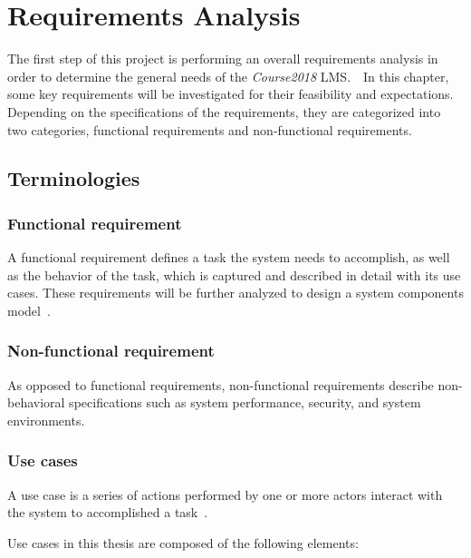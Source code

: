 

\chapter{Requirements Analysis}
\label{chap:REQS}

The first step of this project is performing an overall requirements analysis
in order to determine the general needs of the \emph{Course2018} LMS.\ \ 
In this chapter, some key requirements will be investigated for their
feasibility and expectations.
Depending on the specifications of the requirements, they are categorized into
two categories, functional requirements and non-functional requirements.

\section{Terminologies}

\subsection{Functional requirement}
A functional requirement defines a task the system needs to accomplish,
as well as the behavior of the task, which is captured and described in detail
with its use cases.
These requirements will be further analyzed to design a system components
model~\cite{functionalReqs}.

\subsection{Non-functional requirement}
As opposed to functional requirements, non-functional requirements describe
non-behavioral specifications such as system performance, security, and system
environments.

\subsection{Use cases}
A use case is a series of actions performed by one or more actors interact
with the system to accomplished a task~\cite{useCase}.

\medskip 

Use cases in this thesis are composed of the following elements:


